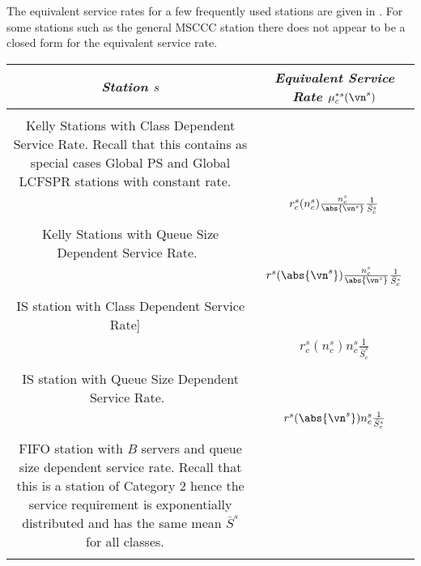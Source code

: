 The equivalent service rates for a few frequently
used stations are given in
. For some stations
such as the general MSCCC station there does not
appear to be a closed form for the equivalent
service rate.
\begin{table}
  \centering
\begin{tabular}{|c|c|}
  \hline
  \emph{Station $s$} & \emph{Equivalent Service Rate $\mu^{*s}_c(\vn^s)$} \\
  \hline
  \hline
 \begin{minipage}[m]{0.50\textwidth}~\\
  Kelly Stations with Class Dependent Service
  Rate.
    Recall that this contains as special cases Global PS and
    Global LCFSPR stations with constant rate. ~\\
 \end{minipage}
 & $r_c^s(n^s_c)
  \frac{n^s_c}{\abs{\vn^s}}\frac{1}{\bar{S}^s_c}$
 \\
 \hline
\begin{minipage}[m]{0.50\textwidth}~\\
Kelly Stations with Queue Size Dependent Service
Rate.~\\
 \end{minipage}
 &
 $r^s(\abs{\vn^s})
  \frac{n^s_c}{\abs{\vn^s}}\frac{1}{\bar{S}^s_c}$
\\
\hline
\begin{minipage}[m]{0.50\textwidth}~\\
IS station with Class Dependent Service Rate]
 ~\\
 \end{minipage}
 &
 $r_c^s(n^s_c)
  n^s_c\frac{1}{\bar{S}^s_c}$
\\
\hline
\begin{minipage}[m]{0.50\textwidth}~\\
IS station with Queue Size Dependent Service
Rate.~\\
 \end{minipage}
 &
 $r^s(\abs{\vn^s})
  n^s_c\frac{1}{\bar{S}^s_c}$
\\
 \hline
\begin{minipage}[m]{0.50\textwidth}~\\
FIFO
 station with $B$ servers and queue size dependent service
 rate. Recall that this is a
 station of Category 2 hence the service
 requirement is exponentially distributed and has
 the same mean $\bar{S}^s$ for all classes.
~\\

\end{minipage}
\end{tabular}
\end{table}
